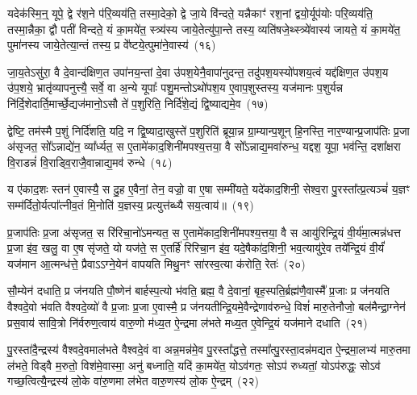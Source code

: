 यदेक॑स्मि॒न्॒ यूपे॒ द्वे र॑श॒ने प॑रि॒व्यय॑ति॒ तस्मा॒देको॒ द्वे जा॒ये वि॑न्दते॒ यन्नैकाꣳ॑ रश॒नां द्वयो॒र्यूप॑योः परि॒व्यय॑ति॒ तस्मा॒न्नैका॒ द्वौ पती॑ विन्दते॒ यं का॒मये॑त॒ स्त्र्य॑स्य जाये॒तेत्यु॑पा॒न्ते तस्य॒ व्यति॑षजे॒थ्स्त्र्ये॑वास्य॑ जायते॒ यं का॒मये॑त॒ पुमा॑नस्य जाये॒तेत्या॒न्तं तस्य॒ प्र वे᳚ष्टये॒त्पुमा॑ने॒वास्य॑~(१६)

जा॒य॒ते\-ऽसु॑रा॒ वै दे॒वान्द॑क्षिण॒त उपा॑नय॒न्तां दे॒वा उ॑पश॒येनै॒वापा॑नुदन्त॒ तदु॑पश॒यस्यो॑पशय॒त्वं यद्द॑क्षिण॒त उ॑पश॒य उ॑प॒शये॒ भ्रातृ॑व्यापनुत्त्यै॒ सर्वे॒ वा अ॒न्ये यूपाः᳚ पशु॒मन्तो\-ऽथो॑पश॒य ए॒वाप॒शुस्तस्य॒ यज॑मानः प॒शुर्यन्न नि॑र्दि॒शेदार्ति॒\-मार्च्छे॒द्यज॑मानो॒\-ऽसौ ते॑ प॒शुरिति॒ निर्दि॑शे॒द्यं द्वि॒ष्याद्यमे॒व~(१७)

द्वेष्टि॒ तम॑स्मै प॒शुं निर्दि॑शति॒ यदि॒ न द्वि॒ष्यादा॒खुस्ते॑ प॒शुरिति॑ ब्रूया॒न्न ग्रा॒म्यान्प॒शून् हि॒नस्ति॒ नार॒ण्यान्प्र॒जा\-प॑तिः प्र॒जा अ॑सृजत॒ सो᳚\-ऽन्नाद्ये॑न॒ व्या᳚र्ध्यत॒ स ए॒तामे॑काद॒शिनी॑मपश्य॒त्तया॒ वै सो᳚\-ऽन्नाद्य॒मवा॑रुन्ध॒ यद्दश॒ यूपा॒ भव॑न्ति॒ दशा᳚क्षरा वि॒राडन्नं॑ वि॒राड्वि॒राजै॒वान्नाद्य॒मव॑ रुन्धे~(१८)

य ए॑काद॒शः स्तन॑ ए॒वास्यै॒ स दु॒ह ए॒वैनां॒ तेन॒ वज्रो॒ वा ए॒षा सम्मी॑यते॒ यदे॑काद॒शिनी॒ सेश्व॒रा पु॒रस्ता᳚त्प्र॒त्यञ्चं॑ य॒ज्ञꣳ सम्म॑र्दितो॒र्यत्पा᳚त्नीव॒तं मि॒नोति॑ य॒ज्ञस्य॒ प्रत्युत्त॑ब्ध्यै सय॒त्वाय॑॥~(१९)

{\anuvakamend[{वै सम॑ष्ट्यै॒ पुमा॑ने॒वास्य॒ यमे॒व रु॑न्धे त्रि॒ꣳ॒शच्च॑}]}%

प्र॒जा\-प॑तिः प्र॒जा अ॑सृजत॒ स रि॑रिचा॒नो॑\-ऽमन्यत॒ स ए॒तामे॑काद॒शिनी॑मपश्य॒त्तया॒ वै स आयु॑रिन्द्रि॒यं वी॒र्य॑मा॒त्मन्न॑धत्त प्र॒जा इ॑व॒ खलु॒ वा ए॒ष सृ॑जते॒ यो यज॑ते॒ स ए॒तर्\mbox{}हि॑ रिरिचा॒न इ॑व॒ यदे॒षैका॑द॒शिनी॒ भव॒त्यायु॑रे॒व तये᳚न्द्रि॒यं वी॒र्यं॑ यज॑मान आ॒त्मन्ध॑त्ते॒ प्रैवा\-ऽऽ\-ग्ने॒येन॑ वापयति मिथु॒नꣳ सा॑रस्व॒त्या क॑रोति॒ रेतः॑~(२०)

सौ॒म्येन॑ दधाति॒ प्र ज॑नयति पौ॒ष्णेन॑ बार्\mbox{}हस्प॒त्यो भ॑वति॒ ब्रह्म॒ वै दे॒वानां॒ बृह॒स्पति॒र्ब्रह्म॑णै॒वास्मै᳚ प्र॒जाः प्र ज॑नयति वैश्वदे॒वो भ॑वति वैश्वदे॒व्यो॑ वै प्र॒जाः प्र॒जा ए॒वास्मै॒ प्र ज॑नयतीन्द्रि॒यमे॒वैन्द्रेणाव॑रुन्धे॒ विशं॑ मारु॒तेनौजो॒ बल॑मैन्द्रा॒ग्नेन॑ प्रस॒वाय॑ सावि॒त्रो नि॑र्वरुण॒त्वाय॑ वारु॒णो म॑ध्य॒त ऐ॒न्द्रमा ल॑भते मध्य॒त ए॒वेन्द्रि॒यं यज॑माने दधाति~(२१)

पु॒रस्ता॑दै॒न्द्रस्य॑ वैश्वदे॒वमाल॑भते वैश्वदे॒वं वा अन्न॒मन्न॑मे॒व पु॒रस्ता᳚द्धत्ते॒ तस्मा᳚त्पु॒रस्ता॒दन्न॑मद्यत ऐ॒न्द्रमा॒लभ्य॑ मारु॒तमा ल॑भते॒ विड्वै म॒रुतो॒ विश॑मे॒वास्मा॒ अनु॑ बध्नाति॒ यदि॑ का॒मये॑त॒ यो\-ऽव॑गतः॒ सो\-ऽप॑ रुध्यतां॒ यो\-ऽप॑रुद्धः॒ सो\-ऽव॑ गच्छ॒त्वित्यै॒न्द्रस्य॑ लो॒के वा॑रु॒णमा ल॑भेत वारु॒णस्य॑ लो॒क ऐ॒न्द्रम्~(२२)

